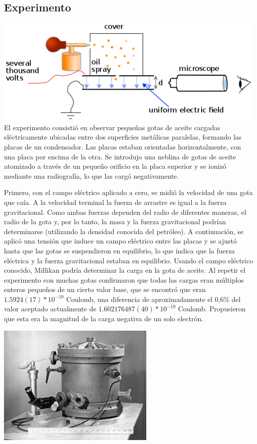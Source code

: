 \documentclass[letterpaper, 10pt, journal]{IEEEtran}
\begin{document}
\subsection{Experimento}
\includegraphics[scale=0.4]{dropmethod}
El experimento consistió en observar pequeñas gotas de aceite cargadas eléctricamente ubicadas entre dos superficies metálicas paralelas, formando las placas de un condensador. Las placas estaban orientadas horizontalmente, con una placa por encima de la otra. Se introdujo una neblina de gotas de aceite atomizado a través de un pequeño orificio en la placa superior y se ionizó mediante una radiografía, lo que las cargó negativamente.
 
Primero, con el campo eléctrico aplicado a cero, se midió la velocidad de una gota que caía. A la velocidad terminal la fuerza de arrastre es igual a la fuerza gravitacional. Como ambas fuerzas dependen del radio de diferentes maneras, el radio de la gota y, por lo tanto, la masa y la fuerza gravitacional podrían determinarse (utilizando la densidad conocida del petróleo). A continuación, se aplicó una tensión que induce un campo eléctrico entre las placas y se ajustó hasta que las gotas se suspendieron en equilibrio, lo que indica que la fuerza eléctrica y la fuerza gravitacional estaban en equilibrio. Usando el campo eléctrico conocido, Millikan podría determinar la carga en la gota de aceite. Al repetir el experimento con muchas gotas confirmaron que todas las cargas eran múltiplos enteros pequeños de un cierto valor base, que se encontró que eran $1.5924 (17) * 10^{-19}$ Coulomb, una diferencia de aproximadamente el 0,6\% del valor aceptado actualmente de $1.602176487 (40) * 10^{-19}$ Coulomb. Propusieron que esta era la magnitud de la carga negativa de un solo electrón.

\includegraphics[scale=1.5]{dropmethod2}
\end{document}
